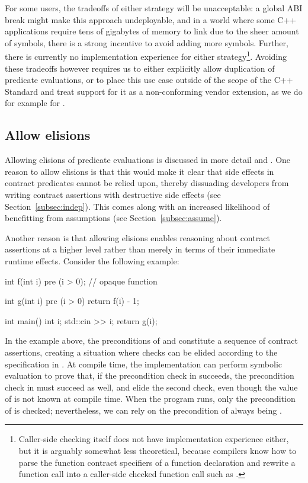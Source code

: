 For some users, the tradeoffs of either strategy will be unacceptable: a global ABI break might make this approach undeployable, and in a world where some C++ applications require tens of gigabytes of memory to link due to the sheer amount of symbols, there is a strong incentive to avoid adding more symbols. Further, there is currently no implementation experience for either strategy\footnote{Caller-side checking itself does not have implementation experience either, but it is arguably somewhat less theoretical, because compilers know how to parse the function contract specifiers of a function declaration and rewrite a function call  into a caller-side checked function call such as \mbox{}.}. Avoiding these tradeoffs however requires us to either explicitly allow duplication of predicate evaluations, or to place this use case outside of the scope of the C++ Standard and treat support for it as a non-conforming vendor extension, as we do for example for .

\subsection{Allow elisions}
\label{subsec:elisions}

Allowing elisions of predicate evaluations is discussed in more detail \cite{P1670R0} and \cite{P2751R1}. One reason to allow elisions is that this would make it clear that side effects in contract predicates cannot be relied upon, thereby dissuading developers from writing contract assertions with destructive side effects (see Section~\ref{subsec:indep}). This comes along with an increased likelihood of benefitting from assumptions (see Section~\ref{subsec:assume}). 

Another reason is that allowing elisions enables reasoning about contract assertions at a higher level rather than merely in terms of their immediate runtime effects. Consider the following example:
\begin{codeblock}
int f(int i)
  pre (i > 0);  // opaque function
  
int g(int i)
  pre (i > 0) {
  return f(i) - 1;
}

int main() {
  int i;
  std::cin >> i;
  return g(i);
}
\end{codeblock}
In the example above, the preconditions of  and  constitute a sequence of contract assertions, creating a situation where checks can be elided according to the specification in \cite{P2900R6}. At compile time, the implementation can perform symbolic evaluation to prove that, if the precondition check in  succeeds, the precondition check in  must succeed as well, and elide the second check, even though the value of  is not known at compile time. When the program runs, only the precondition of  is checked; nevertheless, we can rely on the precondition of  always being .

